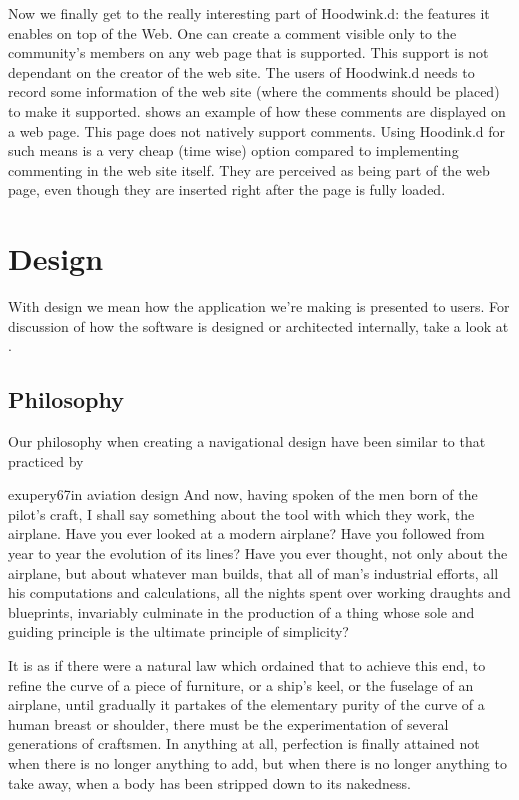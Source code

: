 Now we finally get to the really interesting part of Hoodwink.d: the features
it enables on top of the Web. One can create a comment visible only to the
community's members on any web page that is supported. This support is not
dependant on the creator of the web site. The users of Hoodwink.d needs to
record some information of the web site (where the comments should be placed)
to make it supported.  shows an
example of how these comments are displayed on a web page.
This page does not natively support
comments. Using Hoodink.d for such means is a very cheap (time wise) option
compared to implementing commenting in the web site itself.
They are perceived as being part of the web page, even though they
are inserted right after the page is fully loaded.

\section{Design}
\label{section:implementation.design}

With design we mean how the application we're making is
presented to users. For discussion of how the software is designed
or architected internally, take a look at
.

\subsection{Philosophy}

Our philosophy when creating a navigational design have been
similar to that practiced by
\begin{fullquotation}[\chap{3}]{exupery67}{in aviation design}
  \noindent
  And now, having spoken of the men born of the pilot's craft, I shall say
  something about the tool with which they work, the airplane. Have you
  ever looked at a modern airplane? Have you followed from year to year
  the evolution of its lines? Have you ever thought, not only about the
  airplane, but about whatever man builds, that all of man's industrial
  efforts, all his computations and calculations, all the nights spent
  over working draughts and blueprints, invariably culminate in the
  production of a thing whose sole and guiding principle is the ultimate
  principle of simplicity?

  It is as if there were a natural law which ordained that to achieve this
  end, to refine the curve of a piece of furniture, or a ship's keel, or
  the fuselage of an airplane, until gradually it partakes of the
  elementary purity of the curve of a human breast or shoulder, there must
  be the experimentation of several generations of craftsmen. In anything
  at all, perfection is finally attained not when there is no longer
  anything to add, but when there is no longer anything to take away,
  when a body has been stripped down to its nakedness.
\end{fullquotation}

